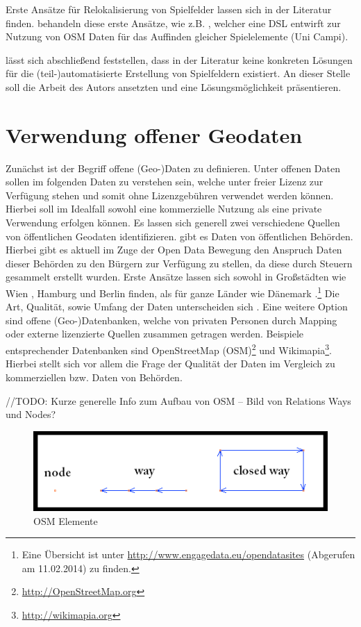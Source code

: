 Erste Ansätze für Relokalisierung von Spielfelder lassen sich in der Literatur finden. behandeln diese erste Ansätze, wie z.B. \citep{Mannara.2012}, welcher eine DSL entwirft zur Nutzung von OSM Daten für das Auffinden gleicher Spielelemente (Uni Campi).

lässt sich abschließend feststellen, dass in der Literatur keine konkreten Lösungen für die (teil-)automatisierte Erstellung von Spielfeldern existiert.
An dieser Stelle soll die Arbeit des Autors ansetzten und eine Lösungsmöglichkeit präsentieren.

\section{Verwendung offener Geodaten}
\label{ch3:s:offeneGeodaten}

Zunächst ist der Begriff offene (Geo-)Daten zu definieren.
Unter offenen Daten sollen im folgenden Daten zu verstehen sein, welche unter freier Lizenz zur Verfügung stehen und somit ohne Lizenzgebühren verwendet werden können. Hierbei soll im Idealfall sowohl eine kommerzielle Nutzung als eine private Verwendung erfolgen können.
Es lassen sich generell zwei verschiedene Quellen von öffentlichen Geodaten identifizieren.
gibt es Daten von öffentlichen Behörden. Hierbei gibt es aktuell im Zuge der Open Data Bewegung \cite{Oreilly.2007} den Anspruch Daten dieser Behörden zu den Bürgern zur Verfügung zu stellen, da diese durch Steuern gesammelt erstellt wurden. Erste Ansätze lassen sich sowohl in Großstädten wie Wien \cite{Wien.2014}, Hamburg \cite{Hamburg.2014} und Berlin \cite{Berlin.2014} finden, als für ganze Länder wie Dänemark \cite{Denmark.2014}.\footnote{Eine Übersicht ist unter \url{http://www.engagedata.eu/opendatasites} (Abgerufen am 11.02.2014) zu finden. } Die Art, Qualität, sowie Umfang der Daten unterscheiden sich . 
Eine weitere Option sind offene (Geo-)Datenbanken, welche von privaten Personen durch Mapping oder externe lizenzierte Quellen zusammen getragen werden.
Beispiele entsprechender Datenbanken sind OpenStreetMap (OSM)\footnote{\url{http://OpenStreetMap.org}} und Wikimapia\footnote{\url{http://wikimapia.org}}.
Hierbei stellt sich vor allem die Frage der Qualität der Daten im Vergleich zu kommerziellen bzw. Daten von Behörden.

//TODO: Kurze generelle Info zum Aufbau von OSM -- Bild von Relations Ways und Nodes?

\begin{figure}[H]
\begin{center}
\includegraphics[width=120mm]{images/ch3_img03_OSM1.png}
\caption{OSM Elemente}
\label{img:ch03_img03_OSM1}
\end{center}
\end{figure}

